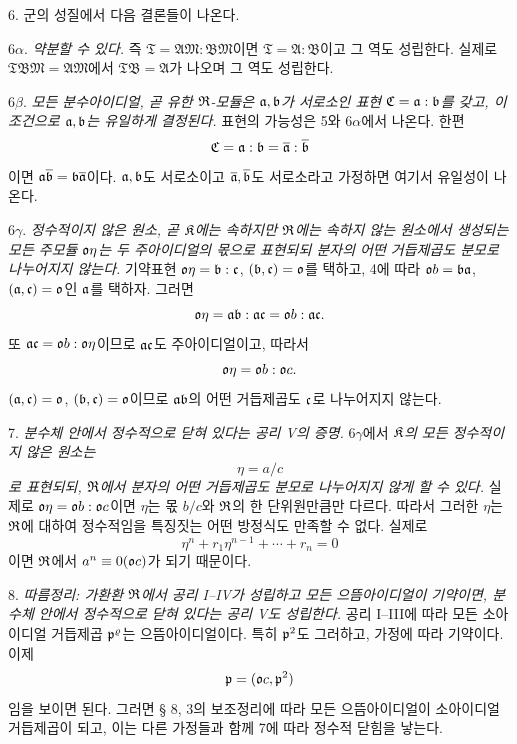 6. 군의 성질에서 다음 결론들이 나온다.

6\(\alpha\). \emph{약분할 수 있다.} 즉 \(\mathfrak T=\mathfrak A\mathfrak M:\mathfrak B\mathfrak M\)이면 \(\mathfrak T=\mathfrak A:\mathfrak B\)이고 그 역도 성립한다. 실제로 \(\mathfrak T\mathfrak B\mathfrak M=\mathfrak A\mathfrak M\)에서 \(\mathfrak T\mathfrak B=\mathfrak A\)가 나오며 그 역도 성립한다.

6\(\beta\). \emph{모든 분수아이디얼, 곧 유한 \(\mathfrak{R}\)-모듈은 \(\mathfrak{a},\mathfrak{b}\)가 서로소인 표현 \(\mathfrak C=\mathfrak{a}:\mathfrak{b}\)를 갖고, 이 조건으로 \(\mathfrak{a},\mathfrak{b}\)는 유일하게 결정된다.} 표현의 가능성은 5와 6\(\alpha\)에서 나온다. 한편
\[
        \mathfrak C=\mathfrak{a}:\mathfrak{b}=\overline{\mathfrak{a}}:\overline{\mathfrak{b}}
\]
이면 \(\mathfrak{a}\overline{\mathfrak{b}}=\mathfrak{b}\overline{\mathfrak{a}}\)이다. \(\mathfrak{a},\mathfrak{b}\)도 서로소이고 \(\overline{\mathfrak{a}},\overline{\mathfrak{b}}\)도 서로소라고 가정하면 여기서 유일성이 나온다.

6\(\gamma\). \emph{정수적이지 않은 원소, 곧 \(\mathfrak{K}\)에는 속하지만 \(\mathfrak{R}\)에는 속하지 않는 원소에서 생성되는 모든 주모듈 \(\mathfrak{o}\eta\)는 두 주아이디얼의 몫으로 표현되되 분자의 어떤 거듭제곱도 분모로 나누어지지 않는다.} 기약표현 \(\mathfrak{o}\eta=\mathfrak{b}:\mathfrak{c}\), \((\mathfrak{b},\mathfrak{c})=\mathfrak{o}\)를 택하고, 4에 따라 \(\mathfrak{o} b=\mathfrak{b}\mathfrak{a}\), \((\mathfrak{a},\mathfrak{c})=\mathfrak{o}\)인 \(\mathfrak{a}\)를 택하자. 그러면
\[
        \mathfrak{o}\eta=\mathfrak{a}\mathfrak{b}:\mathfrak{a}\mathfrak{c}=\mathfrak{o} b:\mathfrak{a}\mathfrak{c}.
\]
또 \(\mathfrak{a}\mathfrak{c}=\mathfrak{o} b:\mathfrak{o}\eta\)이므로 \(\mathfrak{a}\mathfrak{c}\)도 주아이디얼이고, 따라서
\[
        \mathfrak{o}\eta=\mathfrak{o} b:\mathfrak{o} c.
\]
\((\mathfrak{a},\mathfrak{c})=\mathfrak{o}\), \((\mathfrak{b},\mathfrak{c})=\mathfrak{o}\)이므로 \(\mathfrak{a}\mathfrak{b}\)의 어떤 거듭제곱도 \(\mathfrak{c}\)로 나누어지지 않는다.

7. \emph{분수체 안에서 정수적으로 닫혀 있다는 공리 V의 증명.} 6\(\gamma\)에서 \emph{\(\mathfrak{K}\)의 모든 정수적이지 않은 원소는}
\[
        \eta=a/c
\]
\emph{로 표현되되, \(\mathfrak{R}\)에서 분자의 어떤 거듭제곱도 분모로 나누어지지 않게 할 수 있다.} 실제로 \(\mathfrak{o}\eta=\mathfrak{o} b:\mathfrak{o} c\)이면 \(\eta\)는 몫 \(b/c\)와 \(\mathfrak{R}\)의 한 단위원만큼만 다르다. 따라서 그러한 \(\eta\)는 \(\mathfrak{R}\)에 대하여 정수적임을 특징짓는 어떤 방정식도 만족할 수 없다. 실제로
\[
        \eta^n+r_1\eta^{n-1}+\cdots+r_n=0
\]
이면 \(\mathfrak{R}\)에서 \(a^n\equiv0(\mathfrak{o} c)\)가 되기 때문이다.

8. \emph{따름정리: 가환환 \(\mathfrak{R}\)에서 공리 I--IV가 성립하고 모든 으뜸아이디얼이 기약이면, 분수체 안에서 정수적으로 닫혀 있다는 공리 V도 성립한다.} 공리 I--III에 따라 모든 소아이디얼 거듭제곱 \(\mathfrak{p}^\varrho\)는 으뜸아이디얼이다. 특히 \(\mathfrak{p}^2\)도 그러하고, 가정에 따라 기약이다. 이제
\[
        \mathfrak{p}=(\mathfrak{o} c,\mathfrak{p}^2)
\]
임을 보이면 된다. 그러면 § 8, 3의 보조정리에 따라 모든 으뜸아이디얼이 소아이디얼 거듭제곱이 되고, 이는 다른 가정들과 함께 7에 따라 정수적 닫힘을 낳는다.

